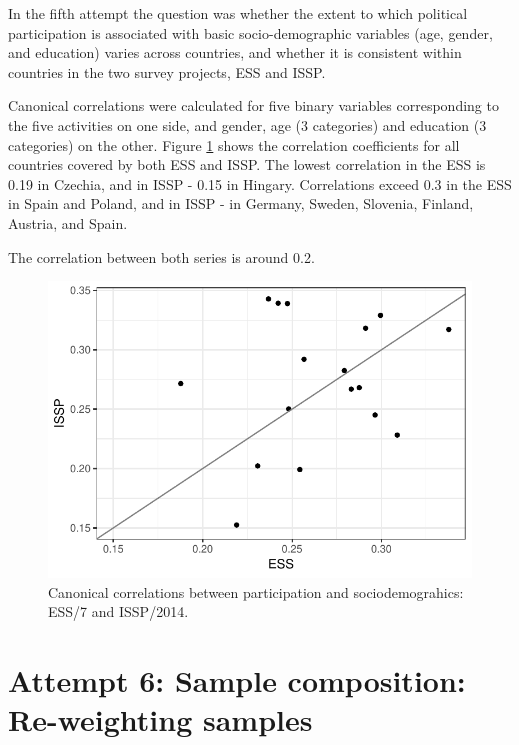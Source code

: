 \documentclass[12pt,]{article}
\begin{document}
In the fifth attempt the question was whether the extent to which political participation is associated with basic socio-demographic variables (age, gender, and education) varies across countries, and whether it is consistent within countries in the two survey projects, ESS and ISSP.

Canonical correlations were calculated for five binary variables corresponding to the five activities on one side, and gender, age (3 categories) and education (3 categories) on the other. Figure \ref{fig:can-cor} shows the correlation coefficients for all countries covered by both ESS and ISSP. The lowest correlation in the ESS is 0.19 in Czechia, and in ISSP - 0.15 in Hingary. Correlations exceed 0.3 in the ESS in Spain and Poland, and in ISSP - in Germany, Sweden, Slovenia, Finland, Austria, and Spain.

The correlation between both series is around 0.2.

\begin{figure}[H]

{\centering \includegraphics{report_files/figure-latex/can-cor-1} 

}

\caption{Canonical correlations between participation and sociodemograhics: ESS/7 and ISSP/2014.}\label{fig:can-cor}
\end{figure}

\hypertarget{attempt-6-sample-composition-re-weighting-samples}{%
\section{Attempt 6: Sample composition: Re-weighting samples}\label{attempt-6-sample-composition-re-weighting-samples}}
\end{document}
